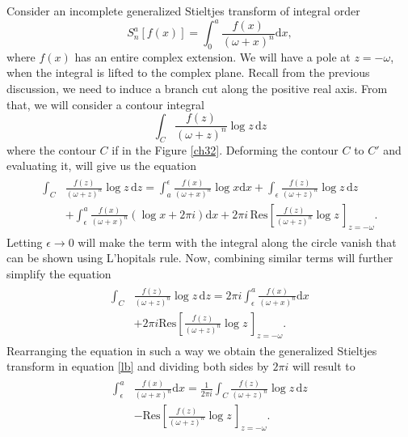 Consider an incomplete generalized Stieltjes transform of integral order 
\begin{equation}\label{lb}
	S_{n}^{a}[f(x)] = \int_{0}^{a}\frac{f(x)}{(\omega+x)^{n}}\mathrm{d}x,
\end{equation} 
where $f(x)$ has an entire complex extension. We will have a pole at $z = -\omega$, when the integral is lifted to the complex plane. Recall from the previous discussion, we need to induce a branch cut along the positive real axis. From that, we will consider a contour integral 
\begin{equation}
    \int_C \frac{f(z)}{(\omega +z)^{n}} \log z \, \mathrm{d}z
\end{equation}
where the contour $C$ if in the Figure \ref{ch32}. Deforming the contour $C$ to $C'$ and evaluating it, will give us the equation
\begin{align}
\begin{split}
    \int_C & \frac{f(z)}{(\omega +z)^{n}} \log z \, \mathrm{d}z = \int_{a}^{\epsilon} \frac{f(x)}{(\omega +x)^{n}} \log x \mathrm{d}x + \int_\epsilon  \frac{f(z)}{(\omega +z)^{n}} \log z \, \mathrm{d}z \\& + \int_{\epsilon}^{a} \frac{f(x)}{(\omega +x)^{n}} (\log x + 2 \pi i) \mathrm{d}x + 2 \pi i \, \mathrm{Res} \left[\frac{f(z)}{(\omega +z)^{n}} \log z \,  \right]_{z=-\omega}.
\end{split}
\end{align}
Letting $\epsilon \to 0$ will make the term with the integral along the circle vanish that can be shown using L'hopitals rule. Now, combining similar terms will further simplify the equation
\begin{align}
\begin{split}
    \int_C & \frac{f(z)}{(\omega +z)^{n}} \log z \, \mathrm{d}z = 2 \pi i \int_{\epsilon}^{a} \frac{f(x)}{(\omega +x)^{n}} \mathrm{d}x  \\& + 2 \pi i\mathrm{Res} \left[\frac{f(z)}{(\omega +z)^{n}} \log z \,  \right]_{z=-\omega}.
\end{split}
\end{align}
Rearranging the equation in such a way we obtain the generalized Stieltjes transform in equation \eqref{lb} and dividing both sides by $2 \pi i$ will result to
\begin{align}
\begin{split} \label{3.47}
    \int_{\epsilon}^{a} & \frac{f(x)}{(\omega +x)^{n}} \mathrm{d}x = \frac{1}{2 \pi i} \int_C \frac{f(z)}{(\omega +z)^{n}} \log z \, \mathrm{d}z  \\& - \mathrm{Res} \left[\frac{f(z)}{(\omega +z)^{n}} \log z \,  \right]_{z=-\omega}.
\end{split}
\end{align}
